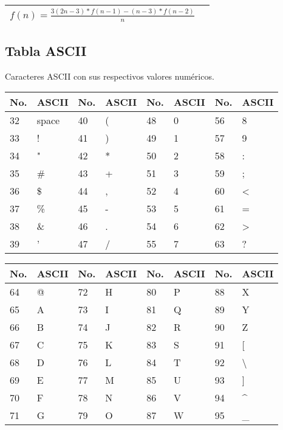 \documentclass[10pt,landscape,twocolumn,letterpaper,twosided]{article}
\begin{document}
{{\begin{center}
{\begin{supertabular}{|p{1.8cm}|p{8.6cm}|}
						$f(n) = \displaystyle\frac{3(2n-3)*f(n-1) - (n-3)*f(n-2)}{n}$
						\\ \hline

					\end{supertabular}
					}
				\end{center}		
		
		\subsection{Tabla ASCII}
			Caracteres ASCII con sus respectivos valores numéricos.
			\begin{table}[H]
				\begin{tabular}{|l|l|l|l|l|l|l|l|}
					\hline \textbf{No.} & \textbf{ASCII} & \textbf{No.} & \textbf{ASCII}  &
						\textbf{No.} & \textbf{ASCII} & \textbf{No.} & \textbf{ASCII} \\ \hline
					32 & space & 40 & ( & 48 & 0 & 56 & 8 \\ \hline
					33 &  ! & 41 & ) & 49 & 1 & 57 & 9 \\ \hline
					34 &  " & 42 & * & 50 & 2 & 58 & : \\ \hline
					35 & \# & 43 & + & 51 & 3 & 59 & ; \\ \hline
					36 & \$ & 44 & , & 52 & 4 & 60 & < \\ \hline
					37 & \% & 45 & - & 53 & 5 & 61 & = \\ \hline
					38 & \& & 46 & . & 54 & 6 & 62 & > \\ \hline
					39 &  ' & 47 & / & 55 & 7 & 63 & ? \\ \hline
				\end{tabular}
			\end{table}
		
			\begin{tabular}{|l|l|l|l|l|l|l|l|}
				\hline \textbf{No.} & \textbf{ASCII} & \textbf{No.} & \textbf{ASCII}  &
					\textbf{No.} & \textbf{ASCII} & \textbf{No.} & \textbf{ASCII} \\ \hline
				64 & @ & 72 & H & 80 & P & 88 & X \\ \hline
				65 & A & 73 & I & 81 & Q & 89 & Y \\ \hline
				66 & B & 74 & J & 82 & R & 90 & Z \\ \hline
				67 & C & 75 & K & 83 & S & 91 & [ \\ \hline
				68 & D & 76 & L & 84 & T & 92 & \textbackslash \\ \hline
				69 & E & 77 & M & 85 & U & 93 & ] \\ \hline
				70 & F & 78 & N & 86 & V & 94 & \textasciicircum \\ \hline
				71 & G & 79 & O & 87 & W & 95 & \_ \\ \hline
			\end{tabular}
		
}}
\end{document}
